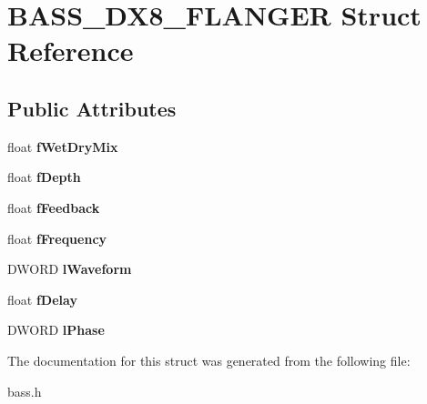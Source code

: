 \hypertarget{structBASS__DX8__FLANGER}{}\section{B\+A\+S\+S\+\_\+\+D\+X8\+\_\+\+F\+L\+A\+N\+G\+E\+R Struct Reference}
\label{structBASS__DX8__FLANGER}
\subsection*{Public Attributes}
\begin{DoxyCompactItemize}
\item 
\hypertarget{structBASS__DX8__FLANGER_ac538b83d3967c7f5658f05a020f86b1b}{}float {\bfseries f\+Wet\+Dry\+Mix}\label{structBASS__DX8__FLANGER_ac538b83d3967c7f5658f05a020f86b1b}

\item 
\hypertarget{structBASS__DX8__FLANGER_ad3e6b0734a3eca90563e76d660b41326}{}float {\bfseries f\+Depth}\label{structBASS__DX8__FLANGER_ad3e6b0734a3eca90563e76d660b41326}

\item 
\hypertarget{structBASS__DX8__FLANGER_ae28f1dfe21710942e12599ccc6e48ca7}{}float {\bfseries f\+Feedback}\label{structBASS__DX8__FLANGER_ae28f1dfe21710942e12599ccc6e48ca7}

\item 
\hypertarget{structBASS__DX8__FLANGER_ab0bb5ca242d239183c4caa369b7575e7}{}float {\bfseries f\+Frequency}\label{structBASS__DX8__FLANGER_ab0bb5ca242d239183c4caa369b7575e7}

\item 
\hypertarget{structBASS__DX8__FLANGER_ae05f4fd19f4938bea9b178077f1c6ac5}{}D\+W\+O\+R\+D {\bfseries l\+Waveform}\label{structBASS__DX8__FLANGER_ae05f4fd19f4938bea9b178077f1c6ac5}

\item 
\hypertarget{structBASS__DX8__FLANGER_a912410d445465d67601775f4cccdee4e}{}float {\bfseries f\+Delay}\label{structBASS__DX8__FLANGER_a912410d445465d67601775f4cccdee4e}

\item 
\hypertarget{structBASS__DX8__FLANGER_a2dd3286e5ffc91673f0f1594ad4d2b8a}{}D\+W\+O\+R\+D {\bfseries l\+Phase}\label{structBASS__DX8__FLANGER_a2dd3286e5ffc91673f0f1594ad4d2b8a}

\end{DoxyCompactItemize}


The documentation for this struct was generated from the following file\+:\begin{DoxyCompactItemize}
\item 
bass.\+h\end{DoxyCompactItemize}
